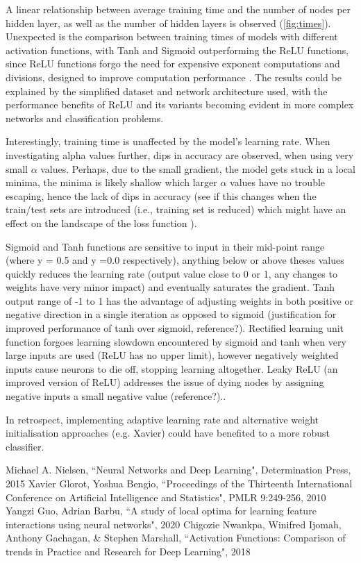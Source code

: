 \documentclass{article}
\begin{document}
A linear relationship between average training time and the number of nodes per hidden layer, as well as the number of hidden layers is observed (\ref{fig:times}). Unexpected is the comparison between training times of models with different activation functions, with Tanh and Sigmoid outperforming the ReLU functions, since ReLU functions forgo the need for expensive exponent computations and divisions, designed to improve computation performance \cite{Niwa}. The results could be explained by the simplified dataset and network architecture used, with the performance benefits of ReLU and its variants becoming evident in more complex networks and classification problems.

Interestingly, training time is unaffected by the model's learning rate. When investigating alpha values further, dips in accuracy are observed, when using very small $\alpha$ values. Perhaps, due to the small gradient, the model gets stuck in a local minima, the minima is likely shallow which larger $\alpha$ values have no trouble escaping, hence the lack of dips in accuracy (see if this changes when the train/test sets are introduced (i.e., training set is reduced) which might have an effect on the landscape of the loss function \cite{Guo}).

Sigmoid and Tanh functions are sensitive to input in their mid-point range (where y = 0.5 and y =0.0 respectively), anything below or above theses values quickly reduces the learning rate (output value close to 0 or 1, any changes to weights have very minor impact) and eventually saturates the gradient.
Tanh output range of -1 to 1 has the advantage of adjusting weights in both positive or negative direction in a single iteration as opposed to sigmoid (justification for improved performance of tanh over sigmoid, reference?).
Rectified learning unit function forgoes learning slowdown encountered by sigmoid and tanh when very large inputs are used (ReLU has no upper limit), however negatively weighted inputs cause neurons to die off, stopping learning altogether. Leaky ReLU (an improved version of ReLU) addresses the issue of dying nodes by assigning negative inputs a small negative value (reference?)..

In retrospect, implementing adaptive learning rate and alternative weight initialisation approaches (e.g. Xavier) could have benefited to a more robust classifier.

\begin{thebibliography}{10}
 Michael A. Nielsen, ``Neural Networks and Deep Learning", Determination Press, 2015
Xavier Glorot, Yoshua Bengio, ``Proceedings of the Thirteenth International Conference on Artificial Intelligence and Statistics", PMLR 9:249-256, 2010
  Yangzi Guo, Adrian Barbu, ``A study of local optima for learning feature interactions using neural networks", 2020
 Chigozie Nwankpa, Winifred Ijomah, Anthony Gachagan, & Stephen Marshall, ``Activation Functions: Comparison of trends in Practice and Research for Deep Learning", 2018

\end{thebibliography}
\end{document}
